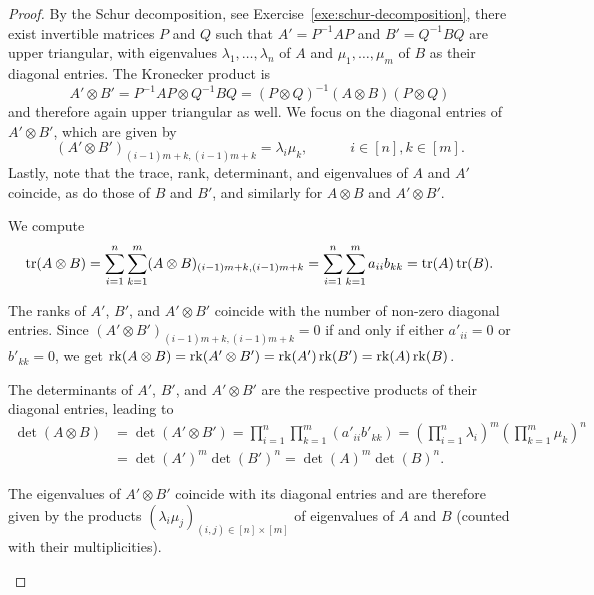 \documentclass[a4paper, oneside, 12pt]{amsart}
\begin{document}
\begin{proof}
  By the Schur decomposition, see Exercise~\ref{exe:schur-decomposition}, there exist invertible matrices \( P \) and \( Q \) such that \( A' = P^{-1}AP \) and \( B' = Q^{-1}BQ \) are upper triangular, with eigenvalues \( \lambda_1, \dots, \lambda_n \) of \( A \) and \( \mu_1, \dots, \mu_m \) of \( B \) as their diagonal entries.
  The  Kronecker product is
   \begin{equation*}
    A' \otimes B' = P^{-1}AP \otimes Q^{-1}BQ = (P \otimes Q)^{-1}(A \otimes B)(P \otimes Q)
  \end{equation*}
  and therefore again upper triangular as well.
  We focus on the diagonal entries of \(A' \otimes B'\), which are given by
  \begin{equation*}
    (A' \otimes B')_{(i-1)m +k,(i-1)m +k} = \lambda_{i}\mu_{k}, \qquad\quad i \in [n], k\in[m].
  \end{equation*}
  Lastly, note that the trace, rank, determinant, and eigenvalues of \( A \) and \( A' \) coincide, as do those of \( B \) and \( B' \), and similarly for \( A \otimes B \) and \( A' \otimes B' \).
  \begin{thmlist}
    \item We compute
    \begin{equation*}
      \operatorname{tr}(A\otimes B)
      = \sum_{i=1}^{n}\sum_{k=1}^{m}(A \otimes B)_{(i-1)m +k,(i-1)m +k}
      = \sum_{i=1}^{n}\sum_{k=1}^{m} a_{ii}b_{kk}
      = \operatorname{tr}(A) \operatorname{tr}(B).
    \end{equation*}
    \item The ranks of \(A'\), \(B'\), and \(A' \otimes B'\)  coincide with the number of non-zero diagonal entries.
    Since \((A' \otimes B')_{(i-1)m +k,(i-1)m +k} = 0\) if and only if either \(a'_{ii}=0\) or \(b'_{kk}=0\), we get
    \(\operatorname{rk}(A\otimes B) = \operatorname{rk}(A' \otimes B' ) = \operatorname{rk}(A') \operatorname{rk}(B') = \operatorname{rk}(A) \operatorname{rk}(B)\).
    \item The determinants of \(A'\), \(B'\), and \( A' \otimes B' \)  are the respective products of their diagonal entries, leading to
    \begin{align*}
      \det(A\otimes B)
      & = \det(A' \otimes B') = \prod_{i=1}^n \prod_{k=1}^m (a'_{ii} b'_{kk})
        = \left( \prod_{i=1}^n \lambda_{i} \right)^m \left( \prod_{k=1}^m \mu_{k} \right)^n\\
      & = \det(A')^m \det(B')^n
        = \det(A)^m \det(B)^n.
    \end{align*}
    \item The eigenvalues of \( A' \otimes B' \) coincide with its diagonal entries and are therefore given by the products \((\lambda_{i}\mu_{j})_{(i,j)\in [n]\times[m]}\) of eigenvalues of \(A\) and \(B\) (counted with their multiplicities). \qedhere
  \end{thmlist}
\end{proof}
\end{document}
